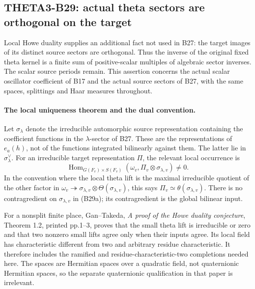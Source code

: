 \subsection{THETA3-B29: actual theta sectors are orthogonal on the target}\label{B29}

Local Howe duality supplies an additional fact not used in B27:
the target images of its distinct source sectors are orthogonal.
Thus the inverse of the original fixed theta kernel is a finite
sum of positive-scalar multiples of algebraic sector inverses.
The scalar source periods remain.  This assertion concerns the
actual scalar oscillator coefficient of B17 and the actual
source sectors of B27, with the same spaces, splittings and
Haar measures throughout.

\paragraph{The local uniqueness theorem and the dual convention.}
Let $\sigma_\lambda$ denote the irreducible automorphic source
representation containing the coefficient functions in the
$\lambda$-sector of B27.  These are the representations of
$e_a(h)$, not of the functions integrated bilinearly against
them.  The latter lie in $\sigma_\lambda^\vee$.
For an irreducible target representation $\Pi$, the relevant
local occurrence is
\[
 \operatorname{Hom}_{G(F_v)\times S(F_v)}
             (\omega_v,\Pi_v\otimes\sigma_{\lambda,v})\ne0.
 \tag{B29a}
\]
In the convention where the local theta lift is the maximal
irreducible quotient of the other factor in
$\omega_v\twoheadrightarrow\sigma_{\lambda,v}\otimes
\Theta(\sigma_{\lambda,v})$, this says
$\Pi_v\simeq\theta(\sigma_{\lambda,v})$.
There is no contragredient on $\sigma_{\lambda,v}$ in
(B29a); its contragredient is the global bilinear input.

For a nonsplit finite place, Gan--Takeda,
\emph{A proof of the Howe duality conjecture}, Theorem 1.2,
printed pp.1--3, proves that the small theta lift is
irreducible or zero and that two nonzero small lifts agree
only when their inputs agree.  Its local field has
characteristic different from two and arbitrary residue
characteristic.  It therefore includes the ramified and
residue-characteristic-two completions needed here.
The spaces are Hermitian spaces over a quadratic field,
not quaternionic Hermitian spaces, so the separate
quaternionic qualification in that paper is irrelevant.

